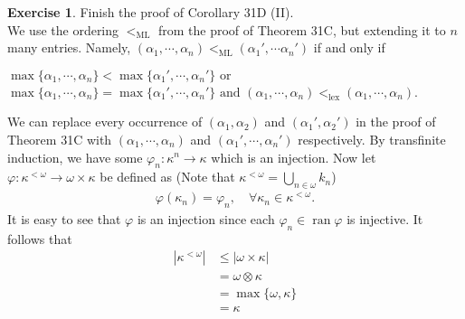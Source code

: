 \documentclass{article}
\theoremstyle{definition}
\newtheorem{exercise}{Exercise}[section]
\begin{document}
    \begin{exercise}
        Finish the proof of Corollary 31D (II).\vspace{1em}\\
        We use the ordering $<_\text{ML}$ from the proof of Theorem 31C, but extending it to $n$ many entries. Namely, $ (\alpha_1, \cdots, \alpha_n) <_{\mathrm{ML}} (\alpha_1', \cdots \alpha_n')$ if and only if
        \begin{center}
            $\max\{\alpha_1, \cdots, \alpha_n\} < \max\{\alpha_1', \cdots, \alpha_n'\} \text{ or } $\\
            $\max\{\alpha_1, \cdots, \alpha_n\} = \max\{\alpha_1', \cdots, \alpha_n'\} \text{ and } (\alpha_1, \cdots, \alpha_n) <_{\mathrm{lex}} (\alpha_1, \cdots, \alpha_n)$.
        \end{center}
        We can replace every occurrence of $(\alpha_1, \alpha_2)$ and $(\alpha_1', \alpha_2')$ in the proof of Theorem 31C with $(\alpha_1, \cdots, \alpha_n)$ and $(\alpha_1', \cdots, \alpha_n')$ respectively. By transfinite induction, we have some $\varphi_n: \kappa^n \rightarrow \kappa$ which is an injection. Now let $\varphi: \kappa^{<\omega} \rightarrow \omega \times \kappa$ be defined as (Note that $\kappa^{<\omega} = \bigcup_{n\in \omega}k_n$)
        \begin{align*}
            \varphi(\kappa_n) = \varphi_n, \quad \forall \kappa_n \in \kappa^{<\omega}.
        \end{align*}
        It is easy to see that $\varphi$ is an injection since each $\varphi_n \in \operatorname{ran} \varphi$ is injective.
        It follows that 
        \begin{align*}
            |\kappa^{<\omega}| &\leq |\omega \times \kappa| \tag{Cantor-Berstein}\\
                               &= \omega \otimes \kappa \tag{Def of cardinal multiplication} \\
                               &= \max\{\omega, \kappa\} \tag{Corollary 31D (I)}\\
                               &= \kappa \tag{$\omega = \aleph_0$ is the smallest infinite cardinal}
        \end{align*}
    \end{exercise}
\end{document}
